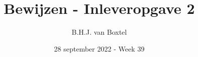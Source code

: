\documentclass[12pt, a4paper]{article}
\begin{document}
\title{Bewijzen - Inleveropgave 2}
\author{B.H.J. van Boxtel}
\date{28 september 2022 - Week 39} 

\maketitle
{} %

\begin{enumerate}[(a).] 


\end{enumerate}
\end{document}
